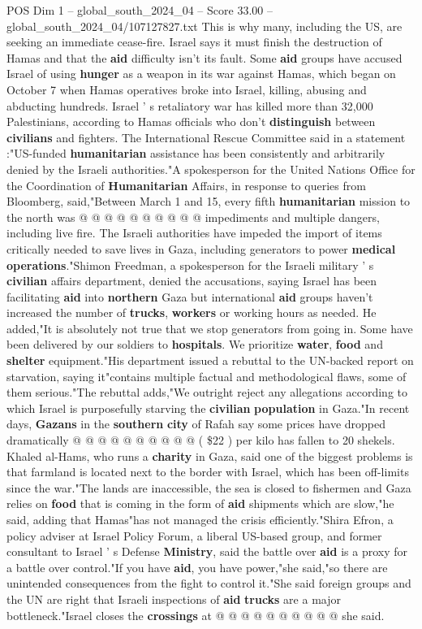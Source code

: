 \begin{textsample}{POS Dim 1 – global\_south\_2024\_04 – Score 33.00 – global\_south\_2024\_04/107127827.txt}
This is why many, including the US, are seeking an immediate cease-fire.
Israel says it must finish the destruction of Hamas and that the \textbf{aid} difficulty isn't its fault.
Some \textbf{aid} groups have accused Israel of using \textbf{hunger} as a weapon in its war against Hamas, which began on October 7 when Hamas operatives broke into Israel, killing, abusing and abducting hundreds.
Israel ' s retaliatory war has killed more than 32,000 Palestinians, according to Hamas officials who don't \textbf{distinguish} between \textbf{civilians} and fighters.
The International Rescue Committee said in a statement :"US-funded \textbf{humanitarian} assistance has been consistently and arbitrarily denied by the Israeli authorities."A spokesperson for the United Nations Office for the Coordination of \textbf{Humanitarian} Affairs, in response to queries from Bloomberg, said,"Between March 1 and 15, every fifth \textbf{humanitarian} mission to the north was @ @ @ @ @ @ @ @ @ @ impediments and multiple dangers, including live fire.
The Israeli authorities have impeded the import of items critically needed to save lives in Gaza, including generators to power \textbf{medical} \textbf{operations}."Shimon Freedman, a spokesperson for the Israeli military ' s \textbf{civilian} affairs department, denied the accusations, saying Israel has been facilitating \textbf{aid} into \textbf{northern} Gaza but international \textbf{aid} groups haven't increased the number of \textbf{trucks}, \textbf{workers} or working hours as needed.
He added,"It is absolutely not true that we stop generators from going in.
Some have been delivered by our soldiers to \textbf{hospitals}.
We prioritize \textbf{water}, \textbf{food} and \textbf{shelter} equipment."His department issued a rebuttal to the UN-backed report on starvation, saying it"contains multiple factual and methodological flaws, some of them serious."The rebuttal adds,"We outright reject any allegations according to which Israel is purposefully starving the \textbf{civilian} \textbf{population} in Gaza."In recent days, \textbf{Gazans} in the \textbf{southern} \textbf{city} of Rafah say some prices have dropped dramatically @ @ @ @ @ @ @ @ @ @ ( \$22 ) per kilo has fallen to 20 shekels.
Khaled al-Hams, who runs a \textbf{charity} in Gaza, said one of the biggest problems is that farmland is located next to the border with Israel, which has been off-limits since the war."The lands are inaccessible, the sea is closed to fishermen and Gaza relies on \textbf{food} that is coming in the form of \textbf{aid} shipments which are slow,"he said, adding that Hamas"has not managed the crisis efficiently."Shira Efron, a policy adviser at Israel Policy Forum, a liberal US-based group, and former consultant to Israel ' s Defense \textbf{Ministry}, said the battle over \textbf{aid} is a proxy for a battle over control."If you have \textbf{aid}, you have power,"she said,"so there are unintended consequences from the fight to control it."She said foreign groups and the UN are right that Israeli inspections of \textbf{aid} \textbf{trucks} are a major bottleneck."Israel closes the \textbf{crossings} at @ @ @ @ @ @ @ @ @ @ she said.

\end{textsample}
